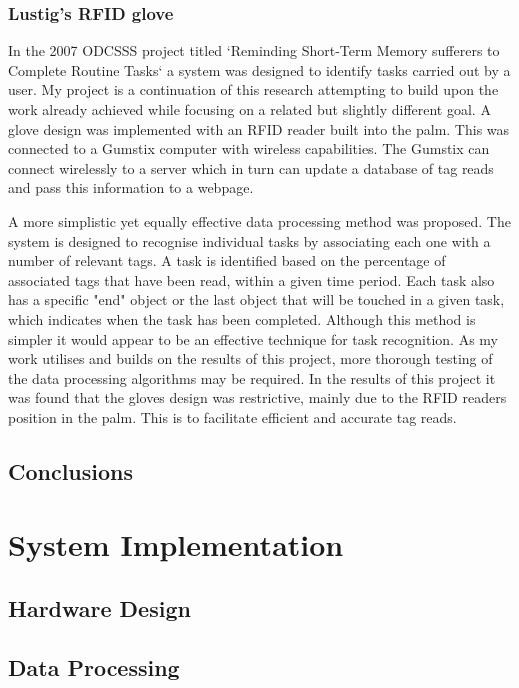 \documentclass[]{final_report}
\begin{document}
\subsection {Lustig's RFID glove}

In the 2007 ODCSSS project titled `Reminding Short-Term Memory sufferers to Complete Routine Tasks` a system was designed to identify tasks carried out by a user. My project is a continuation of this research attempting to build upon the work already achieved while focusing on a related but slightly different goal. A glove design was implemented with an RFID reader built into the palm. This was connected to a Gumstix computer with wireless capabilities. The Gumstix can connect wirelessly to a server which in turn can update a database of tag reads and pass this information to a webpage.

A more simplistic yet equally effective data processing method was proposed. The system is designed to recognise individual tasks by associating each one with a number of relevant tags. A task is identified based on the percentage of associated tags that have been read, within a given time period. Each task also has a specific "end" object or the last object that will be touched in a given task, which indicates when the task has been completed. Although this method is simpler it would appear to be an effective technique for task recognition. As my work utilises and builds on the results of this project, more thorough testing of the data processing algorithms may be required. In the results of this project it was found that the gloves design was restrictive, mainly due to the RFID readers position in the palm. This is to facilitate efficient and accurate tag reads. 

\section{Conclusions}


\chapter{System Implementation}

\section{Hardware Design}

\section{Data Processing}
\newpage
\end{document}
